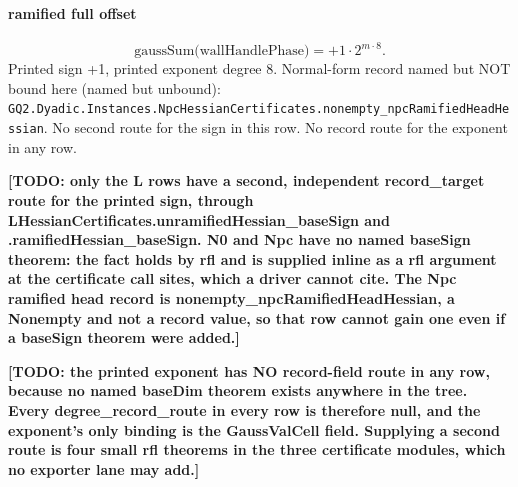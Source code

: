 \paragraph{ramified full offset}
\[\mathrm{gaussSum}\bigl(\mathrm{wallHandlePhase}\bigr)=+1\cdot 2^{m\cdot 8}.\]
Printed sign +1, printed exponent degree 8. Normal-form record named but NOT bound here (named but unbound): \texttt{GQ2.Dyadic.Instances.NpcHessianCertificates.nonempty\_npcRamifiedHeadHessian}.
No second route for the sign in this row. No record route for the exponent in any row.
\par\noindent\textbf{[TODO: only the L rows have a second, independent record\_target route for the printed sign, through LHessianCertificates.unramifiedHessian\_baseSign and .ramifiedHessian\_baseSign. N0 and Npc have no named baseSign theorem: the fact holds by rfl and is supplied inline as a rfl argument at the certificate call sites, which a driver cannot cite. The Npc ramified head record is nonempty\_npcRamifiedHeadHessian, a Nonempty and not a record value, so that row cannot gain one even if a baseSign theorem were added.]}
\par\noindent\textbf{[TODO: the printed exponent has NO record-field route in any row, because no named baseDim theorem exists anywhere in the tree. Every degree\_record\_route in every row is therefore null, and the exponent's only binding is the GaussValCell field. Supplying a second route is four small rfl theorems in the three certificate modules, which no exporter lane may add.]}
